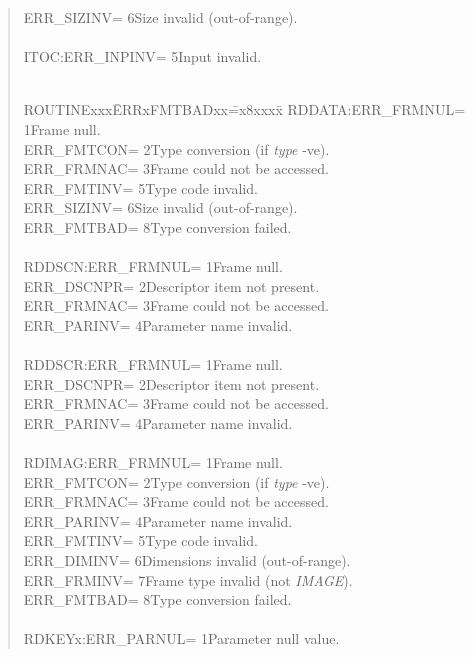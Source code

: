\begin{quote}
\begin{tabbing}
\>ERR\_SIZINV\>= 6\>Size invalid (out-of-range).\\
\\
ITOC:\>ERR\_INPINV\>= 5\>Input invalid.\\
\\
\end{tabbing}
\begin{tabbing}
ROUTINExxx\=ERRxFMTBADxx\==x8xxxx\=\kill
RDDATA:\>ERR\_FRMNUL\>= 1\>Frame null.\\
\>ERR\_FMTCON\>= 2\>Type conversion (if {\em type} -ve).\\
\>ERR\_FRMNAC\>= 3\>Frame could not be accessed.\\
\>ERR\_FMTINV\>= 5\>Type code invalid.\\
\>ERR\_SIZINV\>= 6\>Size invalid (out-of-range).\\
\>ERR\_FMTBAD\>= 8\>Type conversion failed.\\
\\
RDDSCN:\>ERR\_FRMNUL\>= 1\>Frame null.\\
\>ERR\_DSCNPR\>= 2\>Descriptor item not present.\\
\>ERR\_FRMNAC\>= 3\>Frame could not be accessed.\\
\>ERR\_PARINV\>= 4\>Parameter name invalid.\\
\\
RDDSCR:\>ERR\_FRMNUL\>= 1\>Frame null.\\
\>ERR\_DSCNPR\>= 2\>Descriptor item not present.\\
\>ERR\_FRMNAC\>= 3\>Frame could not be accessed.\\
\>ERR\_PARINV\>= 4\>Parameter name invalid.\\
\\
RDIMAG:\>ERR\_FRMNUL\>= 1\>Frame null.\\
\>ERR\_FMTCON\>= 2\>Type conversion (if {\em type} -ve).\\
\>ERR\_FRMNAC\>= 3\>Frame could not be accessed.\\
\>ERR\_PARINV\>= 4\>Parameter name invalid.\\
\>ERR\_FMTINV\>= 5\>Type code invalid.\\
\>ERR\_DIMINV\>= 6\>Dimensions invalid (out-of-range).\\
\>ERR\_FRMINV\>= 7\>Frame type invalid (not {\em IMAGE}).\\
\>ERR\_FMTBAD\>= 8\>Type conversion failed.\\
\\
RDKEYx:\>ERR\_PARNUL\>= 1\>Parameter null value.\\

\end{tabbing}
\end{quote}
